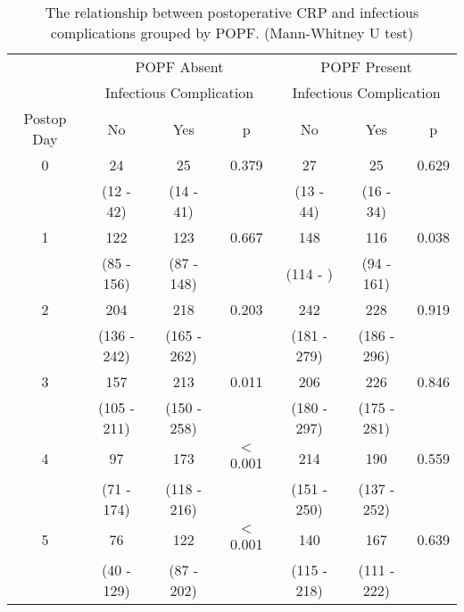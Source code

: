 \begin{table}[h]
	\centering
	\caption{The relationship between postoperative CRP and infectious complications grouped by POPF. (Mann-Whitney U test)}
	\label{table:crp_comp_vs_infections_popf_y1n0}
	\begin{tabular}{| c | c c c | c c c |}
		\hline
		           &       \multicolumn{3}{c}{POPF Absent}       &      \multicolumn{3}{c}{POPF Present}       \\
		           & \multicolumn{3}{c}{Infectious Complication} & \multicolumn{3}{c}{Infectious Complication} \\
		Postop Day & No          & Yes         & p               & No          & Yes         & p               \\ \hline
		0          & 24          & 25          & 0.379           & 27          & 25          & 0.629           \\
		           & (12 - 42)   & (14 - 41)   &                 & (13 - 44)   & (16 - 34)   &  \\
		1          & 122         & 123         & 0.667           & 148         & 116         & 0.038           \\
		           & (85 - 156)  & (87 - 148)  &                 & (114 - )    & (94 - 161)  &  \\
		2          & 204         & 218         & 0.203           & 242         & 228         & 0.919           \\
		           & (136 - 242) & (165 - 262) &                 & (181 - 279) & (186 - 296) &  \\
		3          & 157         & 213         & 0.011           & 206         & 226         & 0.846           \\
		           & (105 - 211) & (150 - 258) &                 & (180 - 297) & (175 - 281) &  \\
		4          & 97          & 173         & $<$0.001        & 214         & 190         & 0.559           \\
		           & (71 - 174)  & (118 - 216) &                 & (151 - 250) & (137 - 252) &  \\
		5          & 76          & 122         & $<$0.001        & 140         & 167         & 0.639           \\
		           & (40 - 129)  & (87 - 202)  &                 & (115 - 218) & (111 - 222) &  \\

\end{tabular}
\end{table}
